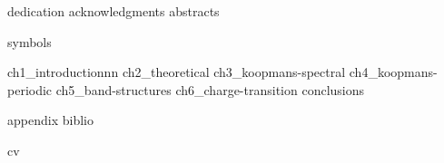 \documentclass[a4paper,11pt]{book}
\begin{document}
\setlength{\parindent}{0pt}
\frontmatter


\setlength{\parskip}{0.5em}

{dedication}
\clearpage
\setcounter{page}{0}
{acknowledgments}
{abstracts}

\setlength{\parskip}{0pt}

\cleardoublepage
{}
{\hypersetup{hidelinks} \tableofcontents}

\cleardoublepage
{}
{}
{\hypersetup{hidelinks} \listoffigures}
 
\cleardoublepage
{}
{}
{\hypersetup{hidelinks} \listoftables}

\cleardoublepage
{}
{}
{symbols}

\setlength{\parskip}{1em}


\mainmatter
%
{ch1_introductionnn}
\cleardoublepage
%
{ch2_theoretical}
\cleardoublepage
%
{ch3_koopmans-spectral}
\cleardoublepage
%
{ch4_koopmans-periodic}
\cleardoublepage
%
{ch5_band-structures}
\cleardoublepage
%
{ch6_charge-transition}
\cleardoublepage
%
{conclusions}
\cleardoublepage

\cleardoublepage
{}


{appendix}
\backmatter
{biblio}

\cleardoublepage
{cv}
\end{document}
